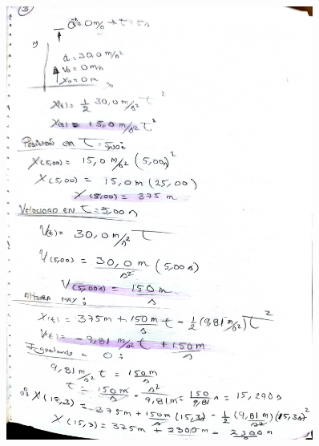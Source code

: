 \documentclass{article}
\begin{document}
\begin{figure}[H]
  \centering
  \includegraphics[width=0.9\textwidth]{assets/3.jpg}
  \label{fig:example_image3}
\end{figure}
\end{document}
